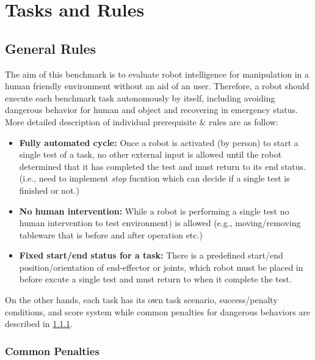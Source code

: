 \chapter{Tasks and Rules}
\label{chap:task}

\section{General Rules}

The aim of this benchmark is to evaluate robot intelligence for manipulation in a human friendly environment without an aid of an user.
Therefore, a robot should execute each benchmark task autonomously by itself,
including avoiding dangerous behavior for human and object and recovering in emergency status.
More detailed description of individual prerequisite \& rules are as follow:
\begin{itemize}
\item
\textbf{Fully automated cycle:}
Once a robot is activated (by person) to start a single test of a task, 
no other external input is allowed until the robot determined that it has completed the test and must return to its end status.
(i.e., need to implement \textit{stop} fucntion which can decide if a single test is finished or not.) 
\item
\textbf{No human intervention:}
While a robot is performing a single test no human intervention to test environment) is allowed
(e.g., moving/removing tableware that is before and after operation etc.)
\item
\textbf{Fixed start/end status for a task:}
There is a predefined start/end position/orientation of end-effector or joints,
which robot must be placed in before excute a single test and must return to when it complete the test.
\end{itemize}

On the other hands, each task has its own task scenario, success/penalty conditions, and score system 
while common penalties for dangerous behaviors are described in \ref{subsec:penalty}. 

\subsection{Common Penalties}
\label{subsec:penalty}

